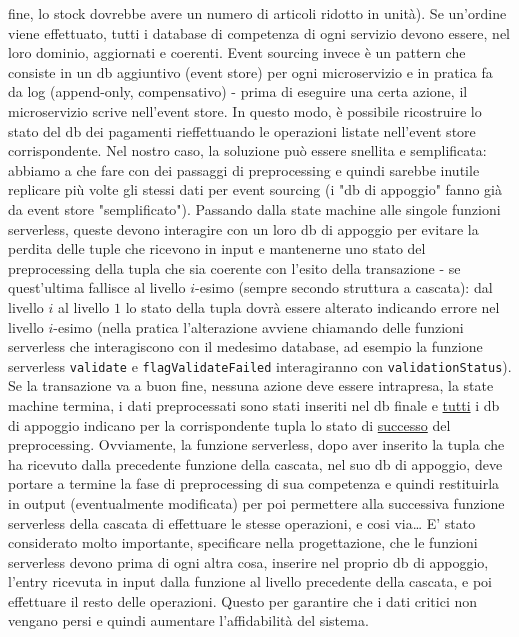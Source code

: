 \documentclass[
    sigconf, 
    screen=false, 
    acmthm=false, 
    nonacm
]{acmart}
\begin{document}
fine, lo stock dovrebbe avere un numero di articoli ridotto in unità).
Se un'ordine viene effettuato, tutti i database di competenza di ogni servizio devono essere, nel loro dominio,
aggiornati e coerenti. 
Event sourcing invece è un pattern che consiste in un db aggiuntivo (event store) per ogni microservizio e in 
pratica fa da log (append-only, compensativo) - prima di eseguire una certa azione, il microservizio scrive 
nell'event store. In questo modo, è possibile ricostruire lo stato del db dei pagamenti rieffettuando le operazioni
listate nell'event store corrispondente.
Nel nostro caso, la soluzione può essere snellita e semplificata: abbiamo a che fare con dei passaggi di 
preprocessing e quindi sarebbe inutile replicare più volte gli stessi dati per event sourcing (i "db di appoggio" 
fanno già da event store "semplificato"). 
Passando dalla state machine alle singole funzioni serverless,
queste devono interagire con un loro db di appoggio per evitare la perdita delle tuple che ricevono in input e
mantenerne uno stato del preprocessing della tupla che sia coerente con l'esito della transazione - se quest'ultima
fallisce al livello $i$-esimo (sempre secondo struttura a cascata): 
dal livello $i$ al livello $1$ lo stato della tupla dovrà essere alterato indicando errore nel livello $i$-esimo (nella
pratica l'alterazione avviene chiamando delle funzioni serverless che interagiscono con il medesimo database, ad 
esempio la funzione serverless \texttt{validate} e \texttt{flagValidateFailed} interagiranno con \texttt{validationStatus}). Se la transazione
va a buon fine, nessuna azione deve essere intrapresa, la state machine termina, i dati preprocessati sono stati
inseriti nel db finale e \underline{tutti} i db di appoggio indicano per la corrispondente tupla lo stato di \underline{successo} del
preprocessing. 
Ovviamente, la funzione serverless, dopo aver inserito la tupla che ha ricevuto dalla precedente funzione della 
cascata, nel suo db di appoggio, deve portare a termine la fase di preprocessing di sua competenza e quindi 
restituirla in output (eventualmente modificata) per poi permettere alla successiva funzione serverless della 
cascata di effettuare le stesse operazioni, e cosi via\dots
E' stato considerato molto importante, specificare nella progettazione, che le funzioni serverless devono prima
di ogni altra cosa, inserire nel proprio db di appoggio, l'entry ricevuta in input dalla funzione al livello 
precedente della cascata, e poi effettuare il resto delle 
operazioni. Questo per garantire che i dati critici non vengano persi e quindi aumentare l'affidabilità del sistema.
\end{document}
